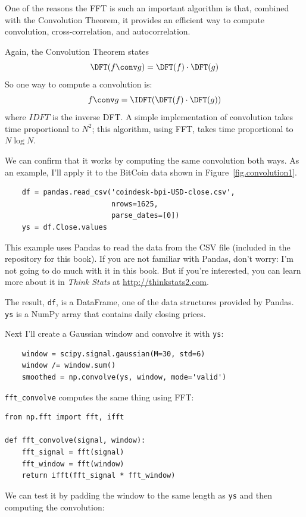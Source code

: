 \documentclass[12pt]{book}
\begin{document}
One of the reasons the FFT is such an important algorithm is that,
combined with the Convolution Theorem, it provides an efficient
way to compute convolution, cross-correlation, and autocorrelation.

Again, the Convolution Theorem states
%
\[ \DFT(f \conv g) = \DFT(f) \cdot \DFT(g) \]
%
So one way to compute a convolution is:
%
\[ f \conv g = \IDFT(\DFT(f) \cdot \DFT(g)) \]
%
where $IDFT$ is the inverse DFT.  A simple implementation of
convolution takes time proportional to $N^2$; this algorithm,
using FFT, takes time proportional to $N \log N$.

We can confirm that it works by computing the same convolution
both ways.  As an example, I'll apply it to the BitCoin data
shown in Figure~\ref{fig.convolution1}.

\begin{verbatim}
    df = pandas.read_csv('coindesk-bpi-USD-close.csv',
                         nrows=1625,
                         parse_dates=[0])
    ys = df.Close.values
\end{verbatim}

This example uses Pandas to read the data from the CSV file (included
in the repository for this book).  If you are not familiar with
Pandas, don't worry: I'm not going to do much with it in this book.
But if you're interested, you can learn more about it in
{\it Think Stats} at \url{http://thinkstats2.com}.

The result, {\tt df}, is a DataFrame, one of the data structures
provided by Pandas.  {\tt ys} is a NumPy array that contains daily
closing prices.

Next I'll create a Gaussian window and convolve it with {\tt ys}:

\begin{verbatim}
    window = scipy.signal.gaussian(M=30, std=6)
    window /= window.sum()
    smoothed = np.convolve(ys, window, mode='valid')
\end{verbatim}

\verb"fft_convolve" computes the same thing using FFT:

\begin{verbatim}
from np.fft import fft, ifft

def fft_convolve(signal, window):
    fft_signal = fft(signal)
    fft_window = fft(window)
    return ifft(fft_signal * fft_window)
\end{verbatim}

We can test it by padding the window to the same length
as {\tt ys} and then computing the convolution:
\end{document}
